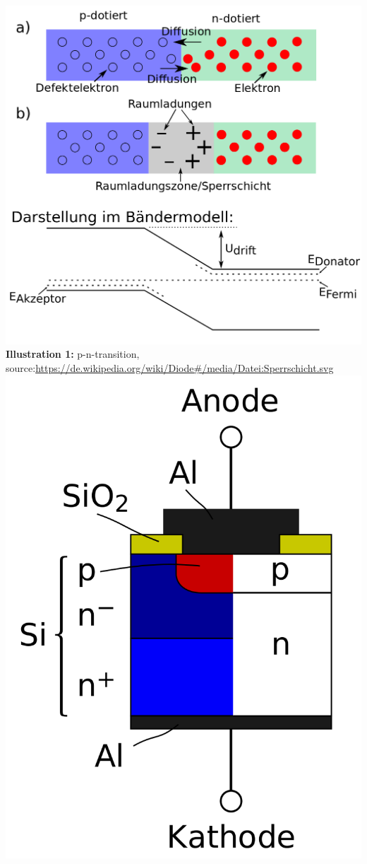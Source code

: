 \documentclass[a4paper, 12pt]{scrartcl}
\begin{document}
\newline 
\hspace*{+3cm}
\includegraphics[scale=0.25]{szpic1}
\newline 
\textbf{Illustration 1:} p-n-transition, source:\space \url{https://de.wikipedia.org/wiki/Diode#/media/Datei:Sperrschicht.svg}
\newline
\hspace*{+3cm}
\includegraphics[scale=0.18]{szpic2}
\end{document}
